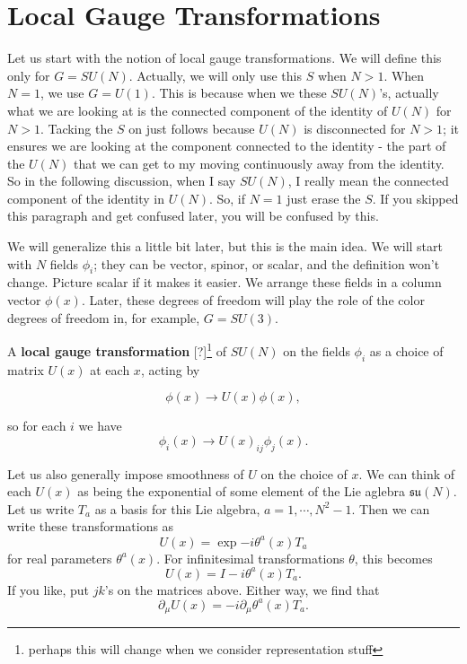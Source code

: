 \documentclass[main.tex]{subfiles}
\begin{document}
\section{Local Gauge Transformations}
Let us start with the notion of local gauge transformations. We will define this only for $G = SU(N)$. Actually, we will only use this $S$ when $N > 1$. When $N = 1$, we use $G = U(1)$. This is because when we these $SU(N)$'s, actually what we are looking at is the connected component of the identity of $U(N)$ for $N > 1$. Tacking the $S$ on just follows because $U(N)$ is disconnected for $N > 1$; it ensures we are looking at the component connected to the identity - the part of the $U(N)$ that we can get to my moving continuously away from the identity. So in the following discussion, when I say $SU(N)$, I really mean the connected component of the identity in $U(N)$. So, if $N=1$ just erase the $S$. If you skipped this paragraph and get confused later, you will be confused by this.

We will generalize this a little bit later, but this is the main idea. We will start with $N$ fields $\phi_i$; they can be vector, spinor, or scalar, and the definition won't change. Picture scalar if it makes it easier. We arrange these fields in a column vector $\phi(x)$. Later, these degrees of freedom will play the role of the color degrees of freedom in, for example, $G = SU(3)$.

\begin{defn}
A \textbf{local gauge transformation} [?]\footnote{perhaps this will change when we consider representation stuff} of $SU(N)$ on the fields $\phi_i$ as a choice of matrix $U(x)$ at each $x$, acting by

\begin{equation} \label{localgaugetrans}
 \boxed{\phi (x) \to U(x) \phi(x),}
\end{equation}

so for each $i$ we have
\[
\phi_i(x) \to U(x)_{ij} \phi_j (x).
\]
\end{defn}
Let us also generally impose smoothness of $U$ on the choice of $x$. We can think of each $U(x)$ as being the exponential of some element of the Lie aglebra $\mathfrak{su} (N)$. Let us write $T_a$ as a basis for this Lie algebra, $a = 1,\cdots, N^2 -1$. Then we can write these transformations as
\[
U(x) = \exp{- i \theta^a (x) T_a}
\]
for real parameters $\theta^a (x)$. For infinitesimal transformations $\theta$, this becomes
\[
U(x) = I - i \theta^a (x) T_a.
\]
If you like, put $jk$'s on the matrices above. Either way, we find that 
\[
\partial_\mu U (x) = -i \partial_\mu \theta^a (x) T_a.
\]
\end{document}
